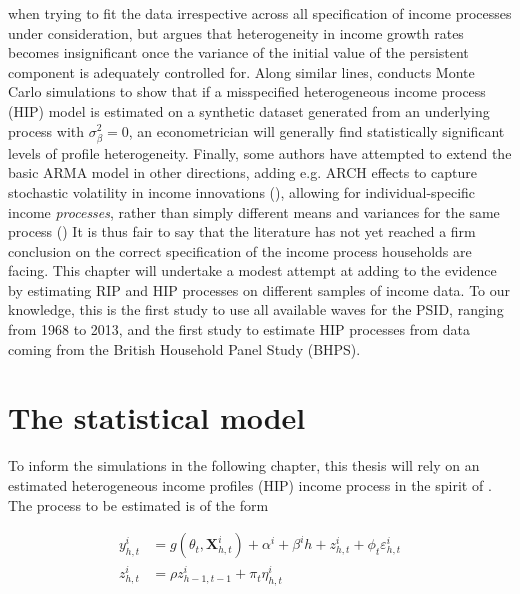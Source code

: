 when trying to fit the data irrespective across all specification of income 
processes under consideration, but argues that heterogeneity in income growth
rates becomes insignificant once the variance of the initial value of the 
persistent component is adequately controlled for. Along similar lines, \citet{Hryshko2012} 
conducts Monte Carlo simulations to show that if a misspecified heterogeneous 
income process (HIP) model is 
estimated on a synthetic dataset generated from an underlying process with
$\sigma^2_{\beta}=0$, an econometrician will generally find statistically 
significant levels of profile heterogeneity. 
Finally, some authors have attempted to extend the basic ARMA model in other 
directions, adding e.g. ARCH effects to capture stochastic volatility in income
innovations (\citealt{MeghirPistaferri2004}), allowing for individual-specific
income \textit{processes}, rather than simply different means and variances for 
the same process (\citealt{BrowningEjrnaesAlvarez2010})
It is thus fair to say that the literature has not yet reached a firm conclusion 
on the correct specification of the income process households are facing. This 
chapter will undertake a modest attempt at adding to the evidence by estimating
RIP and HIP processes on different samples of income data. To our knowledge, 
this is the first study to use all available waves for the PSID, ranging from 
1968 to 2013, and the first study to estimate HIP processes from data coming
from the British Household Panel Study (BHPS).

\section{The statistical model}
To inform the simulations in the following chapter, this thesis will rely on an
estimated heterogeneous income profiles (HIP) income process in the spirit of
\citet{Guvenen2009}. The process to be estimated is of the form

\begin{align}
y_{h,t}^i &= g(\theta_t, \pmb{X}_{h,t}^i) + \alpha^i + \beta^i h + z_{h,t}^i + \phi_t \varepsilon_{h,t}^i \label{incproc} \\
z_{h,t}^i &= \rho z_{h-1,t-1}^i + \pi_t \eta_{h,t}^i \label{persshock}
\end{align}

